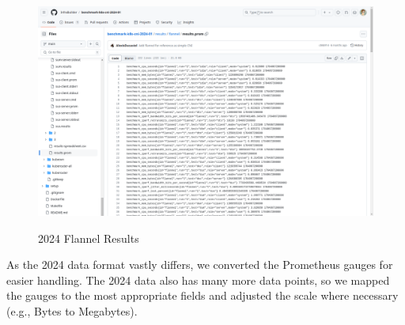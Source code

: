 \begin{figure}[H]
\centering
\caption {2024 Flannel Results}
\includegraphics[width=\linewidth]{images/flannel-prom.png}
\label{fig:flannel-prom}
\end{figure}

As the 2024 data format vastly differs, we converted the Prometheus gauges for easier handling. The 2024 data also has many more data points, so we mapped the gauges to the most appropriate fields and adjusted the scale where necessary (e.g., Bytes to Megabytes).

